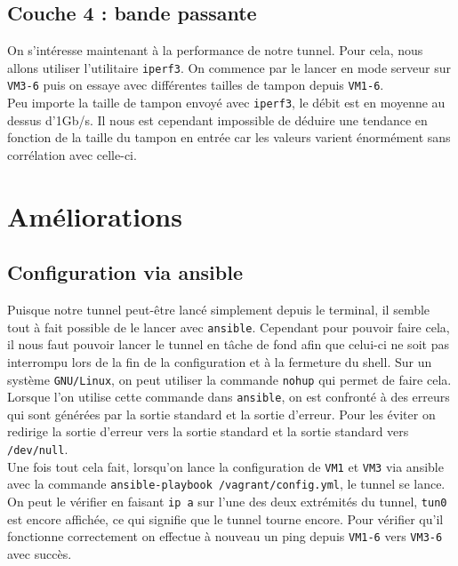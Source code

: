 \documentclass[a4paper, 12pt]{article}
\begin{document}
    \subsection{Couche 4 : bande passante}

    On s'intéresse maintenant à la performance de notre tunnel. Pour cela, nous 
    allons utiliser l'utilitaire \verb+iperf3+. On commence par le lancer en
    mode serveur sur \verb+VM3-6+ puis on essaye avec différentes tailles de 
    tampon depuis \verb+VM1-6+. \\

    Peu importe la taille de tampon envoyé avec \verb+iperf3+, le débit est en 
    moyenne au dessus d'1Gb/s. Il nous est cependant impossible de déduire 
    une tendance en fonction de la taille du tampon en entrée car les valeurs 
    varient énormément sans corrélation avec celle-ci.

    \section{Améliorations}

    \subsection{Configuration via ansible}

    Puisque notre tunnel peut-être lancé simplement depuis le terminal, il 
    semble tout à fait possible de le lancer avec \verb+ansible+. Cependant pour
    pouvoir faire cela, il nous faut pouvoir lancer le tunnel en tâche de fond 
    afin que celui-ci ne soit pas interrompu lors de la fin de la configuration
    et à la fermeture du shell. Sur un système \verb+GNU/Linux+, on peut 
    utiliser la commande \verb+nohup+ qui permet de faire cela. \\

    Lorsque l'on utilise cette commande dans \verb+ansible+, on est confronté à 
    des erreurs qui sont générées par la sortie standard et la sortie d'erreur.
    Pour les éviter on redirige la sortie d'erreur vers la sortie standard et 
    la sortie standard vers \verb+/dev/null+. \\

    Une fois tout cela fait, lorsqu'on lance la configuration de \verb+VM1+
    et \verb+VM3+ via ansible avec la commande \verb+ansible-playbook /vagrant/config.yml+, 
    le tunnel se lance. On peut le vérifier en faisant \verb+ip a+ sur l'une
    des deux extrémités du tunnel, \verb+tun0+ est encore affichée, ce qui 
    signifie que le tunnel tourne encore. Pour vérifier qu'il fonctionne 
    correctement on effectue à nouveau un ping depuis \verb+VM1-6+ vers 
    \verb+VM3-6+ avec succès.
\end{document}
